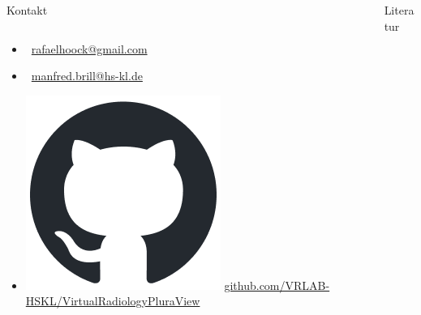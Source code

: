 \documentclass[final,hyperref={pdfpagelabels=false}]{beamer}
\begin{document}
\begin{frame}[t]
\begin{columns}[t]
\begin{column}{.465\textwidth}
\begin{block}{Kontakt}
\begin{columns}[t]
\begin{column}{.6\textwidth}
\vspace*{1.5cm}
\begin{itemize}[leftmargin=0pt]
    \item[] \Letter\ \href{rafaelhoock@gmail.com}{rafaelhoock@gmail.com}
    \item[] \Letter\ \href{manfred.brill@hs-kl.de}{manfred.brill@hs-kl.de}
    \item[] \includegraphics[scale=0.55]{github-mark} \href{https://github.com/VRLAB-HSKL/VirtualRadiologyPluraView}{github.com/VRLAB-HSKL/VirtualRadiologyPluraView}
\end{itemize}
\end{column}
\end{columns}

\end{block}

\end{column} %

\begin{column}{.025\textwidth}\end{column} %

\begin{column}{.465\textwidth}
\nocite{*} %
\begin{block}{Literatur}
\small
 
 
 \vspace*{6mm}
\end{block}





\end{column}
\end{columns}
\end{frame}
\end{document}
